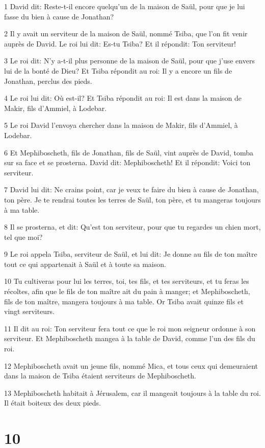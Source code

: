 \par 1 David dit: Reste-t-il encore quelqu'un de la maison de Saül, pour que je lui fasse du bien à cause de Jonathan?
\par 2 Il y avait un serviteur de la maison de Saül, nommé Tsiba, que l'on fit venir auprès de David. Le roi lui dit: Es-tu Tsiba? Et il répondit: Ton serviteur!
\par 3 Le roi dit: N'y a-t-il plus personne de la maison de Saül, pour que j'use envers lui de la bonté de Dieu? Et Tsiba répondit au roi: Il y a encore un fils de Jonathan, perclus des pieds.
\par 4 Le roi lui dit: Où est-il? Et Tsiba répondit au roi: Il est dans la maison de Makir, fils d'Ammiel, à Lodebar.
\par 5 Le roi David l'envoya chercher dans la maison de Makir, fils d'Ammiel, à Lodebar.
\par 6 Et Mephiboscheth, fils de Jonathan, fils de Saül, vint auprès de David, tomba sur sa face et se prosterna. David dit: Mephiboscheth! Et il répondit: Voici ton serviteur.
\par 7 David lui dit: Ne crains point, car je veux te faire du bien à cause de Jonathan, ton père. Je te rendrai toutes les terres de Saül, ton père, et tu mangeras toujours à ma table.
\par 8 Il se prosterna, et dit: Qu'est ton serviteur, pour que tu regardes un chien mort, tel que moi?
\par 9 Le roi appela Tsiba, serviteur de Saül, et lui dit: Je donne au fils de ton maître tout ce qui appartenait à Saül et à toute sa maison.
\par 10 Tu cultiveras pour lui les terres, toi, tes fils, et tes serviteurs, et tu feras les récoltes, afin que le fils de ton maître ait du pain à manger; et Mephiboscheth, fils de ton maître, mangera toujours à ma table. Or Tsiba avait quinze fils et vingt serviteurs.
\par 11 Il dit au roi: Ton serviteur fera tout ce que le roi mon seigneur ordonne à son serviteur. Et Mephiboscheth mangea à la table de David, comme l'un des fils du roi.
\par 12 Mephiboscheth avait un jeune fils, nommé Mica, et tous ceux qui demeuraient dans la maison de Tsiba étaient serviteurs de Mephiboscheth.
\par 13 Mephiboscheth habitait à Jérusalem, car il mangeait toujours à la table du roi. Il était boiteux des deux pieds.

\chapter{10}

